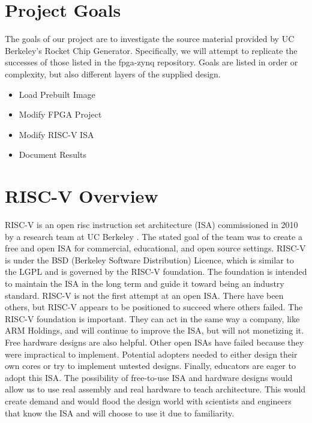 \documentclass[journal]{IEEEtran}
\begin{document}

\section{Project Goals}
The goals of our project are to investigate the source material provided by UC Berkeley's Rocket Chip Generator. Specifically, we will attempt to replicate the successes of those listed in the fpga-zynq \cite{fpga-zynq} repository. Goals are listed in order or complexity, but also different layers of the supplied design. 
\begin{itemize}
\item{Load Prebuilt Image}%
\item{Modify FPGA Project}
\item{Modify RISC-V ISA}
\item{Document Results}
\end{itemize}

\section{RISC-V Overview}
RISC-V is an open risc instruction set architecture (ISA) commissioned in 2010 by a research team at UC Berkeley \cite{Waterman:EECS-2016-118}. The stated goal of the team was to create a free and open ISA for commercial, educational, and open source settings. RISC-V is under the BSD (Berkeley Software Distribution) Licence, which is similar to the LGPL and is governed by the RISC-V foundation. The foundation is intended to maintain the ISA in the long term and guide it toward being an industry standard.\newline
RISC-V is not the first attempt at an open ISA. There have been others, but RISC-V appears to be positioned to succeed where others failed. The RISC-V foundation is important. They can act in the same way a company, like ARM Holdings, and will continue to improve the ISA, but will not monetizing it. Free hardware designs are also helpful. Other open ISAs have failed because they were impractical to implement. Potential adopters needed to either design their own cores or try to implement untested designs. Finally, educators are eager to adopt this ISA. The possibility of free-to-use ISA and hardware designs would allow us to use real assembly and real hardware to teach architecture. This would create demand and would flood the design world with scientists and engineers that know the ISA and will choose to use it due to familiarity.
\end{document}
